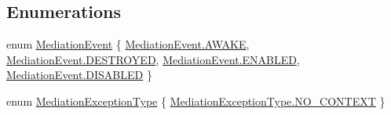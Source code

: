 \subsection*{Enumerations}
\begin{DoxyCompactItemize}
\item 
enum \hyperlink{namespacestrange_1_1extensions_1_1mediation_1_1api_ae5a81bb1edf9fca1d2aca9f4fada72a8}{Mediation\-Event} \{ \hyperlink{namespacestrange_1_1extensions_1_1mediation_1_1api_ae5a81bb1edf9fca1d2aca9f4fada72a8afca549f3541c801906abc34b45e8953e}{Mediation\-Event.\-A\-W\-A\-K\-E}, 
\hyperlink{namespacestrange_1_1extensions_1_1mediation_1_1api_ae5a81bb1edf9fca1d2aca9f4fada72a8a5d7e41d3ac0abca5974598807df874ea}{Mediation\-Event.\-D\-E\-S\-T\-R\-O\-Y\-E\-D}, 
\hyperlink{namespacestrange_1_1extensions_1_1mediation_1_1api_ae5a81bb1edf9fca1d2aca9f4fada72a8ac8cf6eea8f096ed51160b484d97c5bbd}{Mediation\-Event.\-E\-N\-A\-B\-L\-E\-D}, 
\hyperlink{namespacestrange_1_1extensions_1_1mediation_1_1api_ae5a81bb1edf9fca1d2aca9f4fada72a8a055c1a591abb0e8cd86dc969727bcc0b}{Mediation\-Event.\-D\-I\-S\-A\-B\-L\-E\-D}
 \}
\item 
enum \hyperlink{namespacestrange_1_1extensions_1_1mediation_1_1api_aef97993ec02a40c5f887dbfaf4f06e4a}{Mediation\-Exception\-Type} \{ \hyperlink{namespacestrange_1_1extensions_1_1mediation_1_1api_aef97993ec02a40c5f887dbfaf4f06e4aac89f949bb64ae5754bb687bf056de559}{Mediation\-Exception\-Type.\-N\-O\-\_\-\-C\-O\-N\-T\-E\-X\-T}
 \}
\end{DoxyCompactItemize}


